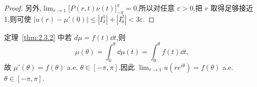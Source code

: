 \begin{proof}
另外,$\lim_{r \to 1}\bigl[P(r, t)\nu(t)\bigr]_{-\pi}^{\pi} = 0$,所以对任意 $\varepsilon > 0$,把 $r$ 取得足够接近 1,则可使 $|u(r) - \mu'(0)| \leq |I_{\delta}^{1}| + |I_{\delta}^{2}| < 3\varepsilon$.
\end{proof}

定理~\ref{thm:2.3.2} 中若 $d\mu = f(t)\dd t$,则
\begin{equation*}
\mu(\theta) = \int_{0}^{\theta}\dd\mu(t) = \int_{0}^{\theta}f(t)\dd t,
\end{equation*}
故 $\mu'(\theta) = f(\theta)$ a.e. $\theta \in [-\pi, \pi]$.因此 $\lim_{r \to 1}u(re^{i\theta}) = f(\theta)$ a.e. $\theta \in [-\pi, \pi]$.
